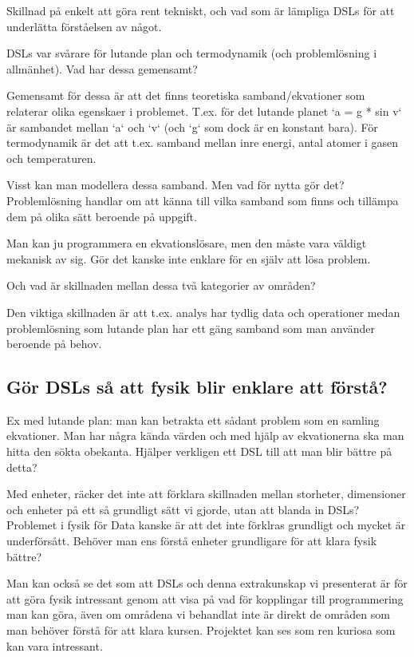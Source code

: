 \begin{binge}
Skillnad på enkelt att göra rent tekniskt, och vad som är lämpliga DSLs för att underlätta förståelsen av något.

\newpage

DSLs var svårare för lutande plan och termodynamik (och problemlösning i allmänhet). Vad har dessa gemensamt?

Gemensamt för dessa är att det finns teoretiska samband/ekvationer som relaterar olika egenskaer i problemet. T.ex. för det lutande planet `a = g * sin v` är sambandet mellan `a` och `v` (och `g` som dock är en konstant bara). För termodynamik är det att t.ex. samband mellan inre energi, antal atomer i gasen och temperaturen.

Visst kan man modellera dessa samband. Men vad för nytta gör det? Problemlösning handlar om att känna till vilka samband som finns och tillämpa dem på olika sätt beroende på uppgift.

Man kan ju programmera en ekvationslösare, men den måste vara väldigt mekanisk av sig. Gör det kanske inte enklare för en själv att lösa problem.

Och vad är skillnaden mellan dessa två kategorier av områden?

Den viktiga skillnaden är att t.ex. analys har tydlig data och operationer medan problemlösning som lutande plan har ett gäng samband som man använder beroende på behov.

\subsection{Gör DSLs så att fysik blir enklare att förstå?}

Ex med lutande plan: man kan betrakta ett sådant problem som en samling ekvationer. Man har några kända värden och med hjälp av ekvationerna ska man hitta den sökta obekanta. Hjälper verkligen ett DSL till att man blir bättre på detta?

Med enheter, räcker det inte att förklara skillnaden mellan storheter, dimensioner och enheter på ett så grundligt sätt vi gjorde, utan att blanda in DSLs? Problemet i fysik för Data kanske är att det inte förklras grundligt och mycket är underförsått. Behöver man ens förstå enheter grundligare för att klara fysik bättre?

Man kan också se det som att DSLs och denna extrakunskap vi presenterat är för att göra fysik intressant genom att visa på vad för kopplingar till programmering man kan göra, även om områdena vi behandlat inte är direkt de områden som man behöver förstå för att klara kursen. Projektet kan ses som ren kuriosa som kan vara intressant.

\end{binge}
